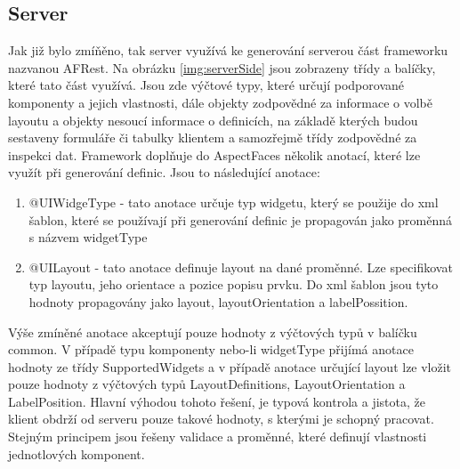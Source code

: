\subsection{Server}
Jak již bylo zmíňěno, tak server využívá ke generování serverou část frameworku nazvanou AFRest. Na obrázku \ref{img:serverSide} jsou zobrazeny třídy a balíčky, které tato část využívá. Jsou zde výčtové typy, které určují podporované komponenty a jejich vlastnosti, dále objekty zodpovědné za informace o volbě layoutu a objekty nesoucí informace o definicích, na základě kterých budou sestaveny formuláře či tabulky klientem a samozřejmě třídy zodpovědné za inspekci dat. Framework doplňuje do AspectFaces několik anotací, které lze využít při generování definic. Jsou to následující anotace:
\begin{enumerate}
\item @UIWidgeType - tato anotace určuje typ widgetu, který se použije do xml šablon, které se používají při generování definic je propagován jako proměnná s názvem widgetType
\item @UILayout - tato anotace definuje layout na dané proměnné. Lze specifikovat typ layoutu, jeho orientace a pozice popisu prvku. Do xml šablon jsou tyto hodnoty propagovány jako layout, layoutOrientation a labelPossition. 
\end{enumerate}
Výše zmíněné anotace akceptují pouze hodnoty z výčtových typů v balíčku common. V případě typu komponenty nebo-li widgetType přijímá anotace hodnoty ze třídy SupportedWidgets a v případě anotace určující layout lze vložit pouze hodnoty z výčtových typů LayoutDefinitions, LayoutOrientation a LabelPosition. Hlavní výhodou tohoto řešení, je typová kontrola a jistota, že klient obdrží od serveru pouze takové hodnoty, s kterými je schopný pracovat. Stejným principem jsou řešeny validace a proměnné, které definují vlastnosti jednotlových komponent. 

